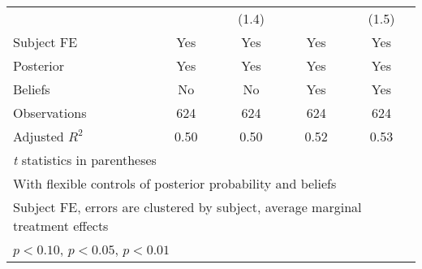 \begin{table}[htbp]
\begin{tabular}{l*{4}{c}}
                &                  &    (1.4)         &                  &    (1.5)         \\
Subject FE      &      Yes         &      Yes         &      Yes         &      Yes         \\
Posterior       &      Yes         &      Yes         &      Yes         &      Yes         \\
Beliefs         &       No         &       No         &      Yes         &      Yes         \\
\hline
Observations    &      624         &      624         &      624         &      624         \\
Adjusted \(R^{2}\)&     0.50         &     0.50         &     0.52         &     0.53         \\
\hline\hline
\multicolumn{5}{l}{\footnotesize \textit{t} statistics in parentheses}\\
\multicolumn{5}{l}{\footnotesize With flexible controls of posterior probability and beliefs}\\
\multicolumn{5}{l}{\footnotesize Subject FE, errors are clustered by subject, average marginal treatment effects}\\
\multicolumn{5}{l}{\footnotesize \sym{*} \(p<0.10\), \sym{**} \(p<0.05\), \sym{***} \(p<0.01\)}\\
\end{tabular}
\end{table}
